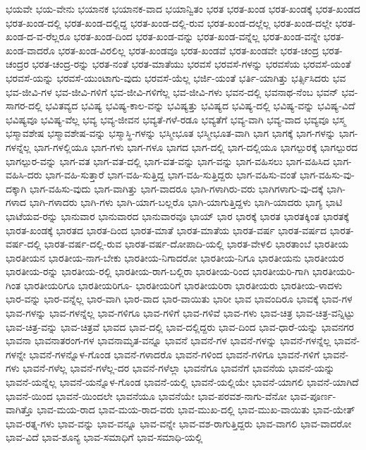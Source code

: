 {ಭಯವೇ
ಭಯ-ವೇನು
ಭಯಾನಕ
ಭಯಾನಕ-ವಾದ
ಭಯಾನ್ವಿತಂ
ಭರತ
ಭರತ-ಖಂಡ
ಭರತ-ಖಂಡಕ್ಕೆ
ಭರತ-ಖಂಡದ
ಭರತ-ಖಂಡ-ದಲ್ಲಿ
ಭರತ-ಖಂಡ-ದಲ್ಲಿದ್ದ
ಭರತ-ಖಂಡ-ದಲ್ಲಿ-ರುವ
ಭರತ-ಖಂಡ-ದಲ್ಲೆಲ್ಲ
ಭರತ-ಖಂಡ-ದಲ್ಲೇ
ಭರತ-ಖಂಡ-ದ-ವ-ರೆಲ್ಲರೂ
ಭರತ-ಖಂಡ-ದಿಂದ
ಭರತ-ಖಂಡ-ವನ್ನು
ಭರತ-ಖಂಡ-ವನ್ನೆಲ್ಲ
ಭರತ-ಖಂಡ-ವನ್ನೇ
ಭರತ-ಖಂಡ-ವಾದರೊ
ಭರತ-ಖಂಡ-ವಿರಲಿಲ್ಲ
ಭರತ-ಖಂಡವೂ
ಭರತ-ಖಂಡವೆ
ಭರತ-ಖಂಡವೇ
ಭರತ-ಚಂದ್ರ
ಭರತ-ಚಂದ್ರರ
ಭರತ-ಚಂದ್ರ-ರನ್ನು
ಭರತ-ನಂತೆ
ಭರತ-ಮಾತೆಯು
ಭರವಸೆ
ಭರವಸೆ-ಗಳನ್ನು
ಭರವಸೆಯ
ಭರವಸೆ-ಯಂತೆ
ಭರವಸೆ-ಯನ್ನು
ಭರವಸೆ-ಯುಂಟಾಗು-ವುದು
ಭರವಸೆ-ಯೆಲ್ಲ
ಭರ್ಜಿ-ಯಂತೆ
ಭರ್ತಿ-ಯಾಗಿತ್ತು
ಭರ್ತ್ಸಿಸಿದರು
ಭವ
ಭವ-ಜೀವಿ-ಗಳ
ಭವ-ಜೀವಿ-ಗಳಿಗೆ
ಭವ-ಜೀವಿ-ಗಳಿಗೆಲ್ಲ
ಭವ-ಜೀವಿ-ಗಳು
ಭವನ-ದಲ್ಲಿ
ಭವನಾಥ-ನೆಂಬ
ಭವನ್
ಭವ-ಸಾಗರ-ದಲ್ಲಿ
ಭವಿತವ್ಯದ
ಭವಿಷ್ಯ
ಭವಿಷ್ಯ-ಕಾಲ-ವನ್ನು
ಭವಿಷ್ಯತ್ತು
ಭವಿಷ್ಯದ
ಭವಿಷ್ಯ-ದಲ್ಲಿ
ಭವಿಷ್ಯ-ವನ್ನು
ಭವಿಷ್ಯ-ವಿದೆ
ಭವಿಷ್ಯವೂ
ಭವಿಷ್ಯ-ವೆಲ್ಲ
ಭವ್ಯ
ಭವ್ಯ-ಜೀವನ
ಭವ್ಯತೆ-ಗಳೆ-ರಡೂ
ಭವ್ಯತೆಗೆ
ಭವ್ಯ-ವಾಗಿ
ಭವ್ಯ-ವಾದ
ಭವ್ಯವೂ
ಭಸ್ಮ
ಭಸ್ಮಾವಶೇಷ
ಭಸ್ಮಾವಶೇಷ-ವನ್ನು
ಭಸ್ಮಾಸ್ಥಿ-ಗಳನ್ನು
ಭಸ್ಮೀಭೂತ
ಭಸ್ಮೀಭೂತ-ವಾಗಿ
ಭಾಗ
ಭಾಗಕ್ಕೆ
ಭಾಗ-ಗಳನ್ನು
ಭಾಗ-ಗಳನ್ನೆಲ್ಲ
ಭಾಗ-ಗಳಲ್ಲಿಯೂ
ಭಾಗ-ಗಳು
ಭಾಗ-ಗಳೂ
ಭಾಗದ
ಭಾಗ-ದಲ್ಲಿ
ಭಾಗ-ದಲ್ಲಿಯೂ
ಭಾಗಲ್ಪುರಕ್ಕೆ
ಭಾಗಲ್ಪುರದ
ಭಾಗಲ್ಪುರ-ವನ್ನು
ಭಾಗ-ವತ
ಭಾಗ-ವತ-ದಲ್ಲಿ
ಭಾಗ-ವತ-ವನ್ನು
ಭಾಗ-ವನ್ನು
ಭಾಗ-ವಹಿಸಲು
ಭಾಗ-ವಹಿಸಿದ
ಭಾಗ-ವಹಿಸಿ-ದರು
ಭಾಗ-ವಹಿ-ಸುತ್ತಾರೆ
ಭಾಗ-ವಹಿ-ಸುತ್ತಿದ್ದ
ಭಾಗ-ವಹಿ-ಸುತ್ತಿದ್ದರು
ಭಾಗ-ವಹಿಸು-ವಂತೆ
ಭಾಗ-ವಹಿಸು-ವು-ದಕ್ಕಾಗಿ
ಭಾಗ-ವಹಿಸು-ವುದು
ಭಾಗ-ವಾಗಿತ್ತು
ಭಾಗ-ವಾದರೂ
ಭಾಗಿ-ಗಳಾಗಿರು-ವರು
ಭಾಗಿಗಳಾಗು-ವು-ದಕ್ಕೆ
ಭಾಗಿ-ಗಳಾದ
ಭಾಗಿ-ಗಳಾದರು
ಭಾಗಿ-ಗಳು
ಭಾಗಿ-ಯಾಗ-ಬಲ್ಲರೊ
ಭಾಗಿ-ಯಾಗುತ್ತಿದ್ದಳು
ಭಾಗಿ-ಯಾದರು
ಭಾಗ್ಯ
ಭಾಟಿ
ಭಾಟೆಯವ-ರನ್ನು
ಭಾನುವಾರ
ಭಾನುವಾರದ
ಭಾನುವಾರವೂ
ಭಾಯ್
ಭಾರ
ಭಾರಕ್ಕೆ
ಭಾರತ
ಭಾರತಕ್ಕಿಂತ
ಭಾರತಕ್ಕೆ
ಭಾರತ-ಖಂಡಕ್ಕೆ
ಭಾರತದ
ಭಾರತ-ದಿಂದ
ಭಾರತ-ಮಾತೆ
ಭಾರತ-ಮಾತೆಯ
ಭಾರತ-ವರ್ಷ
ಭಾರತ-ವರ್ಷದ
ಭಾರತ-ವರ್ಷ-ದಲ್ಲಿ
ಭಾರತ-ವರ್ಷ-ದಲ್ಲಿ-ರುವ
ಭಾರತ-ವರ್ಷ-ದೋಪಾದಿ-ಯಲ್ಲಿ
ಭಾರತ-ವೇಳಲಿ
ಭಾರತಾಂಬೆ
ಭಾರತೀಯ
ಭಾರತೀಯನ
ಭಾರತೀಯ-ನಾಗ-ಬೇಕು
ಭಾರತೀಯ-ನಿಗಾದರೋ
ಭಾರತೀಯ-ನಿಗೂ
ಭಾರತೀಯನು
ಭಾರತೀಯರ
ಭಾರತೀಯ-ರನ್ನು
ಭಾರತೀಯ-ರಲ್ಲಿ
ಭಾರತೀಯ-ರಾಗ-ಬಲ್ಲಿರಾ
ಭಾರತೀಯ-ರಿಂದ
ಭಾರತೀಯರಿ-ಗಾಗಿ
ಭಾರತೀಯರಿ-ಗಿಂತ
ಭಾರತೀಯರಿಗೂ
ಭಾರತೀಯರಿಗೂ-
ಭಾರತೀಯರಿಗೆ
ಭಾರತೀಯರಿರಾ
ಭಾರತೀಯರು
ಭಾರತೀಯ-ಳಾದಳು
ಭಾರ-ವನ್ನು
ಭಾರ-ವನ್ನೆಲ್ಲ
ಭಾರ-ವಾಗಿ
ಭಾರ-ವಾದ
ಭಾರ-ವಾಯಿತು
ಭಾರೀ
ಭಾವ
ಭಾವಂದಿರೂ
ಭಾವಕ್ಕೆ
ಭಾವ-ಗಳ
ಭಾವ-ಗಳನ್ನು
ಭಾವ-ಗಳನ್ನೆಲ್ಲ
ಭಾವ-ಗಳಿಗೂ
ಭಾವ-ಗಳಿಗೆ
ಭಾವ-ಗಳಿವೆ
ಭಾವ-ಗಳು
ಭಾವ-ಚಿತ್ರ
ಭಾವ-ಚಿತ್ರ-ವನ್ನಿಟ್ಟು
ಭಾವ-ಚಿತ್ರ-ವನ್ನು
ಭಾವ-ಚಿತ್ರವೆ
ಭಾವದ
ಭಾವ-ದಲ್ಲಿ
ಭಾವ-ದಲ್ಲಿದ್ದರು
ಭಾವ-ದಿಂದ
ಭಾವ-ಧಾರೆ-ಯನ್ನು
ಭಾವನಗರ
ಭಾವನಾ
ಭಾವನಾತರಂಗ-ಗಳ
ಭಾವನಾಮೃತ-ವನ್ನೂ
ಭಾವನೆ
ಭಾವನೆ-ಗಳ
ಭಾವನೆ-ಗಳನ್ನು
ಭಾವನೆ-ಗಳನ್ನೆಲ್ಲ
ಭಾವನೆ-ಗಳನ್ನೇ
ಭಾವನೆ-ಗಳನ್ನೊಳ-ಗೊಂಡ
ಭಾವನೆ-ಗಳಾದರೊ
ಭಾವನೆ-ಗಳಿಂದ
ಭಾವನೆ-ಗಳಿಗೂ
ಭಾವನೆ-ಗಳಿಗೆ
ಭಾವನೆ-ಗಳು
ಭಾವನೆ-ಗಳೆಲ್ಲ
ಭಾವನೆ-ಗಳೆಲ್ಲ-ದರ
ಭಾವನೆ-ಗಳೆಲ್ಲಾ
ಭಾವನೆಗೂ
ಭಾವನೆಗೆ
ಭಾವನೆಯ
ಭಾವನೆ-ಯನ್ನು
ಭಾವನೆ-ಯನ್ನೆಲ್ಲ
ಭಾವನೆ-ಯನ್ನೊಳ-ಗೊಂಡ
ಭಾವನೆ-ಯಲ್ಲಿ
ಭಾವನೆ-ಯಲ್ಲಿಯೇ
ಭಾವನೆ-ಯಾಗಲಿ
ಭಾವನೆ-ಯಾಗಿದೆ
ಭಾವನೆ-ಯಿಂದ
ಭಾವನೆ-ಯಿಂದಲೇ
ಭಾವನೆಯೂ
ಭಾವನೆಯೇ
ಭಾವ-ಪರವಶ-ನಾಗು-ವೆನೋ
ಭಾವ-ಪೂರ್ಣ-ವಾಗಿತ್ತೊ
ಭಾವ-ಮಯ-ರಾದ
ಭಾವ-ಮಯ-ರಾದ-ವರು
ಭಾವ-ಮುಖ-ದಲ್ಲಿ
ಭಾವ-ಮುಖ-ವಾಯಿತು
ಭಾವ-ಯೇತ್
ಭಾವ-ರತ್ನ-ಗಳು
ಭಾವ-ವನ್ನು
ಭಾವ-ವನ್ನೂ
ಭಾವ-ವನ್ನೇ
ಭಾವ-ವಶ-ರಾಗುತ್ತಿದ್ದರು
ಭಾವ-ವಾಗಲಿ
ಭಾವ-ವಾದರೋ
ಭಾವ-ವಿದೆ
ಭಾವ-ಶೂನ್ಯ
ಭಾವ-ಸಮಾಧಿಗೆ
ಭಾವ-ಸಮಾಧಿ-ಯಲ್ಲಿ
}
